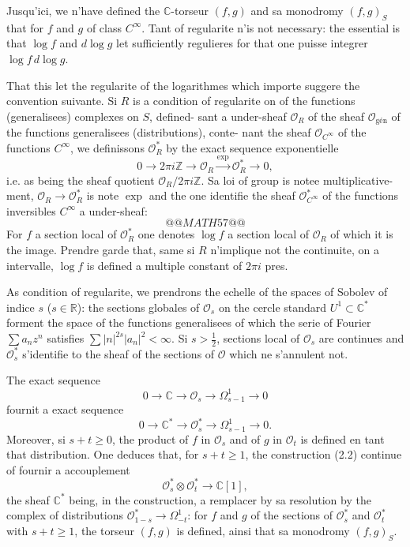 \documentclass[12pt,a4paper]{article}
\theoremstyle{plain}
\theoremstyle{definition}
\theoremstyle{remark}
\newcommand{\cO}{\mathcal{O}}
\newcommand{\Z}{\mathbb{Z}}
\newcommand{\C}{\mathbb{C}}
\newcommand{\R}{\mathbb{R}}
\providecommand{\cO}{\mathcal{O}}
\providecommand{\R}{\mathrm{R}}
\begin{document}
Jusqu'ici, we n'have defined the $\C$-torseur $(f,g)$ and sa monodromy $(f,g)_S$ that
for $f$ and $g$ of class $C^\infty$. Tant of regularite n'is not necessary: the essential is that $\log f$
and $d\log g$ let sufficiently regulieres for that one puisse integrer $\log f \, d\log g$.

That this let the regularite of the logarithmes which importe suggere the convention suivante.
Si $R$ is a condition of regularite on of the functions (generalisees) complexes on $S$, defined-
sant a under-sheaf $\cO_R$ of the sheaf $\cO_{\text{gén}}$ of the functions generalisees (distributions), conte-
nant the sheaf $\cO_{C^\infty}$ of the functions $C^\infty$, we definissons $\cO_R^*$ by the exact sequence exponentielle
\[
0 \to 2\pi i\Z \to \cO_R \xrightarrow{\exp} \cO_R^* \to 0,
\]
i.e. as being the sheaf quotient $\cO_R / 2\pi i\Z$. Sa loi of group is notee multiplicative-
ment, $\cO_R \to \cO_R^*$ is note $\exp$ and the one identifie the sheaf $\cO_{C^\infty}^*$ of the functions inversibles $C^\infty$
a under-sheaf:
\[
@@MATH57@@
\]
For $f$ a section local of $\cO_R^*$ one denotes $\log f$ a section local of $\cO_R$ of which it is the image.
Prendre garde that, same si $R$ n'implique not the continuite, on a intervalle, $\log f$
is defined a multiple constant of $2\pi i$ pres.

As condition of regularite, we prendrons the echelle of the spaces of Sobolev
of indice $s$ ($s \in \R$): the sections globales of $\cO_s$ on the cercle standard $U^1 \subset \C^*$ forment
the space of the functions generalisees of which the serie of Fourier $\sum a_n z^n$ satisfies $\sum |n|^{2s} |a_n|^2 < \infty$.
Si $s > \tfrac{1}{2}$, sections local of $\cO_s$ are continues and $\cO_s^*$ s'identifie to the sheaf of the sections
of $\cO$ which ne s'annulent not.

The exact sequence
\[
0 \to \C \to \cO_s \to \Omega^1_{s-1} \to 0
\]
fournit a exact sequence
\[
0 \to \C^* \to \cO_s^* \to \Omega^1_{s-1} \to 0.
\]
Moreover, si $s + t \geq 0$, the product of $f$ in $\cO_s$ and of $g$ in $\cO_t$ is defined en tant that
distribution. One deduces that, for $s + t \geq 1$, the construction (2.2) continue of fournir
a accouplement
\[
\cO_s^* \otimes \cO_t^* \to \C[1],
\]
the sheaf $\C^*$ being, in the construction, a remplacer by sa resolution by the complex
of distributions $\cO^*_{1-s} \to \Omega^1_{-t}$: for $f$ and $g$ of the sections of $\cO_s^*$ and $\cO_t^*$ with $s + t \geq 1$, the
torseur $(f,g)$ is defined, ainsi that sa monodromy $(f,g)_S$.
\end{document}

